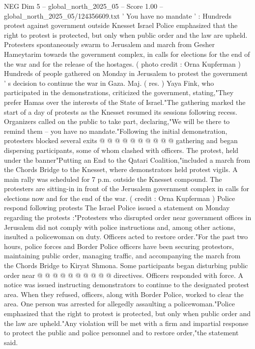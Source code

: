 \begin{textsample}{NEG Dim 5 – global\_north\_2025\_05 – Score 1.00 – global\_north\_2025\_05/124356609.txt}  \label{ex:f5_neg_379}
' You have no mandate ' : Hundreds protest against government outside Knesset Israel Police emphasized that the right to protest is protected, but only when public order and the law are upheld.
Protesters spontaneously swarm to Jerusalem and march from Gesher Hameytarim towards the government complex, in calls for elections for the end of the war and for the release of the hostages. ( photo credit : Orna Kupferman ) Hundreds of people gathered on Monday in Jerusalem to protest the government ' s decision to continue the war in Gaza.
Maj. ( res. ) Yaya Fink, who participated in the demonstrations, criticized the government, stating,"They prefer Hamas over the interests of the State of Israel."The gathering marked the start of a day of protests as the Knesset resumed its sessions following recess.
Organizers called on the public to take part, declaring,"We will be there to remind them -- you have no mandate."Following the initial demonstration, protesters blocked several exits @ @ @ @ @ @ @ @ @ @ gathering and began dispersing participants, some of whom clashed with officers.
The protest, held under the banner"Putting an End to the Qatari Coalition,"included a march from the Chords Bridge to the Knesset, where demonstrators held protest vigils.
A main rally was scheduled for 7 p.m. outside the Knesset compound.
The protesters are sitting-in in front of the Jerusalem government complex in calls for elections now and for the end of the war. ( credit : Orna Kupferman ) Police respond following protests The Israel Police issued a statement on Monday regarding the protests :"Protesters who disrupted order near government offices in Jerusalem did not comply with police instructions and, among other actions, insulted a policewoman on duty.
Officers acted to restore order."For the past two hours, police forces and Border Police officers have been securing protestors, maintaining public order, managing traffic, and accompanying the march from the Chords Bridge to Kiryat Shmona.
Some participants began disturbing public order near @ @ @ @ @ @ @ @ @ @ directives.
Officers responded with force.
A notice was issued instructing demonstrators to continue to the designated protest area.
When they refused, officers, along with Border Police, worked to clear the area.
One person was arrested for allegedly assaulting a policewoman."Police emphasized that the right to protest is protected, but only when public order and the law are upheld."Any violation will be met with a firm and impartial response to protect the public and police personnel and to restore order,"the statement said.

\end{textsample}
